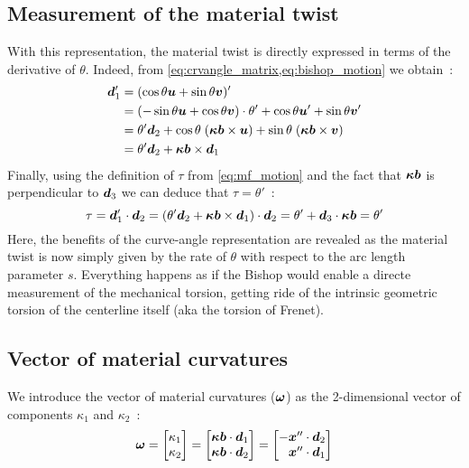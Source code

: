 \subsection{Measurement of the material twist}
With this  representation, the material twist is directly expressed in terms of the derivative of $\theta$. Indeed, from \cref{eq:crvangle_matrix,eq:bishop_motion} we obtain~:
\begin{equation}
	\begin{aligned}
		\boldsymbol{d}'_1 
			&= (\cos{\theta} \boldsymbol{u} + \sin{\theta}\boldsymbol{v})' \\
			& = (-\sin{\theta} \boldsymbol{u} + \cos{\theta}\boldsymbol{v})\cdot \theta' +  \cos{\theta} \boldsymbol{u}' + \sin{\theta}\boldsymbol{v}' \\
			& = \theta' \boldsymbol{d}_2 + \cos{\theta}\; (\boldsymbol{\kappa b} \times \boldsymbol{u}) + \sin{\theta}\; (\boldsymbol{\kappa b} \times \boldsymbol{v})\\
			& = \theta' \boldsymbol{d}_2 + \boldsymbol{\kappa b} \times \boldsymbol{d}_1\\
	\end{aligned}
\end{equation}
Finally, using the definition of $\tau$ from \cref{eq:mf_motion} and the fact that $\boldsymbol{\kappa b}$ is perpendicular to $\boldsymbol{d}_3$ we can deduce that $\tau=\theta'$~:
\begin{equation}
	\tau = \boldsymbol{d}'_1 \cdot \boldsymbol{d}_2 = (\theta'\boldsymbol{d}_2 + \boldsymbol{\kappa b}\times\boldsymbol{d}_1)\cdot \boldsymbol{d}_2 = \theta' + \boldsymbol{d}_3\cdot\boldsymbol{\kappa b} = \theta'
\label{eq:thetatau}
\end{equation}
Here, the benefits of the curve-angle representation are revealed as the material twist is now simply given by the rate of $\theta$ with respect to the arc length parameter $s$. Everything happens as if the Bishop would enable a directe measurement of the mechanical torsion, getting ride of the intrinsic geometric torsion of the centerline itself (aka the torsion of Frenet).
\subsection{Vector of material curvatures}
We introduce the vector of material curvatures ($\boldsymbol{\omega}$) as the 2-dimensional vector of components $\kappa_1$ and $\kappa_2$~:
\begin{equation}
	\vect{\omega} =
	\begin{bmatrix*}[r]
		\kappa_1\\
		\kappa_2\\
	\end{bmatrix*} =
	\begin{bmatrix}
		\vect{\kappa b}\cdot\vect{d}_1\\
		\vect{\kappa b}\cdot\vect{d}_2\\
	\end{bmatrix} =
	\begin{bmatrix*}[r]
		-\vect{x}''\cdot\vect{d}_2\\
		\vect{x}''\cdot\vect{d}_1\\
	\end{bmatrix*}
\end{equation}

